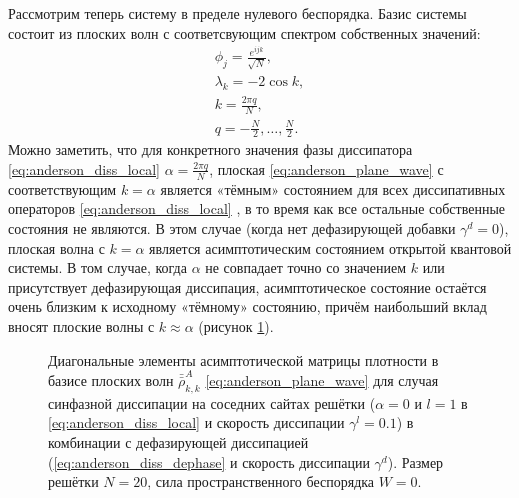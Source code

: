 Рассмотрим теперь систему в пределе нулевого беспорядка. Базис системы состоит из плоских волн с соответсвующим спектром собственных значений:
\begin{equation}
\label{eq:anderson_plane_wave}
\begin{gathered}
\phi_j = \frac{e^{i j k}}{\sqrt{N}}, \\
\lambda_k = -2 \cos{k}, \\
k = \frac{2 \pi q}{N}, \\
q = -\frac{N}{2}, \ldots, \frac{N}{2}.
\end{gathered}
\end{equation}
Можно заметить, что для конкретного значения фазы диссипатора \cref{eq:anderson_diss_local} \(\alpha = \frac{2 \pi q}{N}\), плоская  \cref{eq:anderson_plane_wave} с соответствующим \(k=\alpha\) является «тёмным» состоянием для всех диссипативных операторов \cref{eq:anderson_diss_local} \cite{Diehl2008, Kraus2008}, в то время как все остальные собственные состояния не являются.
В этом случае (когда нет дефазирующей добавки \(\gamma^d = 0\)), плоская волна с \(k = \alpha\) является асимптотическим состоянием открытой квантовой системы. 
В том случае, когда \(\alpha\) не совпадает точно со значением \(k\) или присутствует дефазирующая диссипация, асимптотическое состояние остаётся очень близким к исходному «тёмному» состоянию, причём наибольший вклад вносят плоские волны с \(k \approx \alpha\) (рисунок \cref{fig:anderson_rho_nn_zero_disorder}).
\begin{figure}[ht]
	\caption[Диагональные элементы асимптотической матрицы плотности в базисе Андерсоновских мод при нулевом беспорядке в зависимости от разных типов диссипации]{
		Диагональные элементы асимптотической матрицы плотности в базисе плоских волн \(\bar{\bar{\rho}}^A_{k,k}\) \cref{eq:anderson_plane_wave} для случая синфазной диссипации на соседних сайтах решётки (\(\alpha=0\) и \(l=1\) в \cref{eq:anderson_diss_local} и скорость диссипации \(\gamma^l=0.1\)) в комбинации с дефазирующей диссипацией (\cref{eq:anderson_diss_dephase} и скорость диссипации \(\gamma^d\)). Размер решётки \(N=20\), сила пространственного беспорядка \(W=0\).
	}
	\label{fig:anderson_rho_nn_zero_disorder}
\end{figure}

